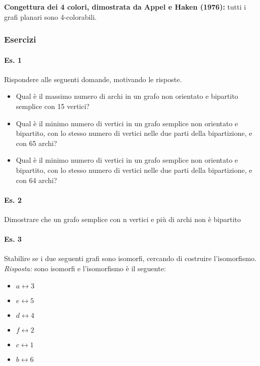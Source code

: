 \noindent
\textbf{Congettura dei 4 colori, dimostrata da Appel e Haken (1976):} tutti i grafi planari sono 4-colorabili.

\subsubsection{Esercizi}
\paragraph{Es. 1} Rispondere alle seguenti domande, motivando le risposte.
\begin{itemize}
    \item Qual è il massimo numero di archi in un grafo non orientato e bipartito semplice con 15
vertici?
    \item Qual è il minimo numero di vertici in un grafo semplice non orientato e bipartito, con lo stesso
numero di vertici nelle due parti della bipartizione, e con 65 archi?
    \item Qual è il minimo numero di vertici in un grafo semplice non orientato e bipartito, con lo stesso
numero di vertici nelle due parti della bipartizione, e con 64 archi?
\end{itemize}

\paragraph{Es. 2} Dimostrare che un grafo semplice con n vertici e più di archi non è bipartito

\paragraph{Es. 3} Stabilire se i due seguenti grafi sono isomorfi, cercando di costruire l'isomorfismo. \\
\emph{Risposta:} sono isomorfi e l'isomorfismo è il seguente: 
\begin{itemize}
    \item \( a \longleftrightarrow 3\)
    \item \(e \longleftrightarrow 5\)
    \item \( d \longleftrightarrow 4\)
    \item \( f \longleftrightarrow 2\)
    \item \(c \longleftrightarrow  1\)
    \item \(b \longleftrightarrow 6 \)
\end{itemize}

